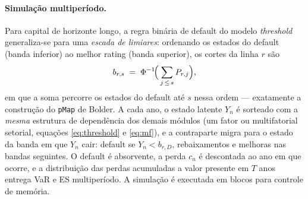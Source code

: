 \documentclass[11pt,a4paper]{article}
\begin{document}
\paragraph{Simulação multiperíodo.} Para capital de horizonte longo, a regra binária de default do modelo \emph{threshold} generaliza-se para uma \emph{escada de limiares}: ordenando os estados do default (banda inferior) ao melhor rating (banda superior), os cortes da linha $r$ são
\begin{equation}
b_{r,s} \;=\; \Phi^{-1}\!\Bigl(\,\sum_{j\,\le\, s} P_{r,j}\Bigr),
\label{eq:escada}
\end{equation}
em que a soma percorre os estados do default até $s$ nessa ordem --- exatamente a construção do \texttt{pMap} de Bolder. A cada ano, o estado latente $Y_n$ é sorteado com a \emph{mesma} estrutura de dependência dos demais módulos (um fator ou multifatorial setorial, equações \eqref{eq:threshold} e \eqref{eq:mf}), e a contraparte migra para o estado da banda em que $Y_n$ cair: default se $Y_n<b_{r,D}$, rebaixamentos e melhoras nas bandas seguintes. O default é absorvente, a perda $c_n$ é descontada ao ano em que ocorre, e a distribuição das perdas acumuladas a valor presente em $T$ anos entrega VaR e ES multiperíodo. A simulação é executada em blocos para controle de memória.
\end{document}
